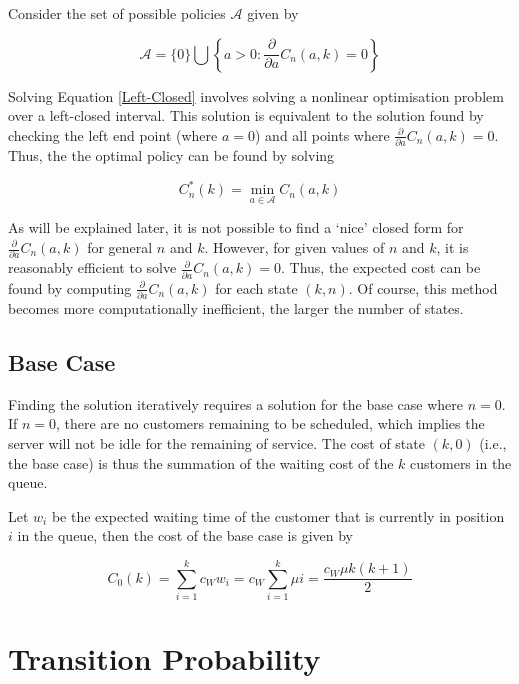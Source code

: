 Consider the set of possible policies $\mathcal{A}$ given by

\begin{equation}
	\mathcal{A} = \{ 0 \} \bigcup \left\{ a > 0 : \frac{\partial}{\partial a} C_{n} (a, k) = 0 \right\}
\end{equation}

Solving Equation \ref{Left-Closed} involves solving a nonlinear optimisation problem over a left-closed interval. This solution is equivalent to the solution found by checking the left end point (where $a = 0$) and all points where $\frac{\partial}{\partial a} C_{n} (a, k) = 0$. Thus, the the optimal policy can be found by solving

\begin{equation}
	C_{n}^{*} (k) = \min_{a \in \mathcal{A}} C_{n} (a, k)
\end{equation}

As will be explained later, it is not possible to find a `nice' closed form for $\frac{\partial}{\partial a} C_{n} (a, k)$ for general $n$ and $k$. However, for given values of $n$ and $k$, it is reasonably efficient to solve $\frac{\partial}{\partial a} C_{n} (a, k) = 0$. Thus, the expected cost can be found by computing $\frac{\partial}{\partial a} C_{n} (a, k)$ for each state $(k, n)$. Of course, this method becomes more computationally inefficient, the larger the number of states.

\subsection{Base Case}

Finding the solution iteratively requires a solution for the base case where $n = 0$. If $n = 0$, there are no customers remaining to be scheduled, which implies the server will not be idle for the remaining of service. The cost of state $(k, 0)$ (i.e., the base case) is thus the summation of the waiting cost of the $k$ customers in the queue.

Let $w_{i}$ be the expected waiting time of the customer that is currently in position $i$ in the queue, then the cost of the base case is given by

\begin{equation}
 	C_{0} (k) = \sum_{i = 1}^{k} c_{W} w_{i} = c_{W} \sum_{i = 1}^{k} \mu i = \frac{c_{W} \mu k (k + 1)}{2}
\end{equation}

\section{Transition Probability}

